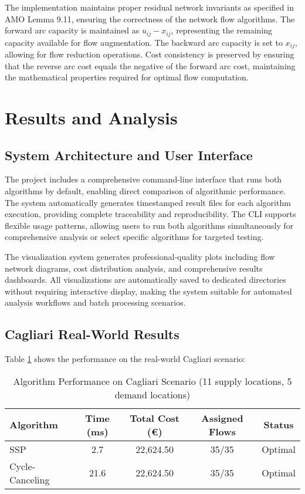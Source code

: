 \documentclass[12pt,a4paper]{article}
\begin{document}
The implementation maintains proper residual network invariants as specified in AMO Lemma 9.11, ensuring the correctness of the network flow algorithms. The forward arc capacity is maintained as $u_{ij} - x_{ij}$, representing the remaining capacity available for flow augmentation. The backward arc capacity is set to $x_{ij}$, allowing for flow reduction operations. Cost consistency is preserved by ensuring that the reverse arc cost equals the negative of the forward arc cost, maintaining the mathematical properties required for optimal flow computation.

\section{Results and Analysis}

\subsection{System Architecture and User Interface}

The project includes a comprehensive command-line interface that runs both algorithms by default, enabling direct comparison of algorithmic performance. The system automatically generates timestamped result files for each algorithm execution, providing complete traceability and reproducibility. The CLI supports flexible usage patterns, allowing users to run both algorithms simultaneously for comprehensive analysis or select specific algorithms for targeted testing.

The visualization system generates professional-quality plots including flow network diagrams, cost distribution analysis, and comprehensive results dashboards. All visualizations are automatically saved to dedicated directories without requiring interactive display, making the system suitable for automated analysis workflows and batch processing scenarios.

\subsection{Cagliari Real-World Results}

Table \ref{tab:cagliari_results} shows the performance on the real-world Cagliari scenario:

\begin{table}[H]
\centering
\caption{Algorithm Performance on Cagliari Scenario (11 supply locations, 5 demand locations)}
\label{tab:cagliari_results}
\begin{tabular}{@{}lcccc@{}}
\toprule
\textbf{Algorithm} & \textbf{Time (ms)} & \textbf{Total Cost (€)} & \textbf{Assigned Flows} & \textbf{Status} \\
\midrule
SSP & 2.7 & 22,624.50 & 35/35 & Optimal \\
Cycle-Canceling & 21.6 & 22,624.50 & 35/35 & Optimal \\
\bottomrule
\end{tabular}
\end{table}
\end{document}
